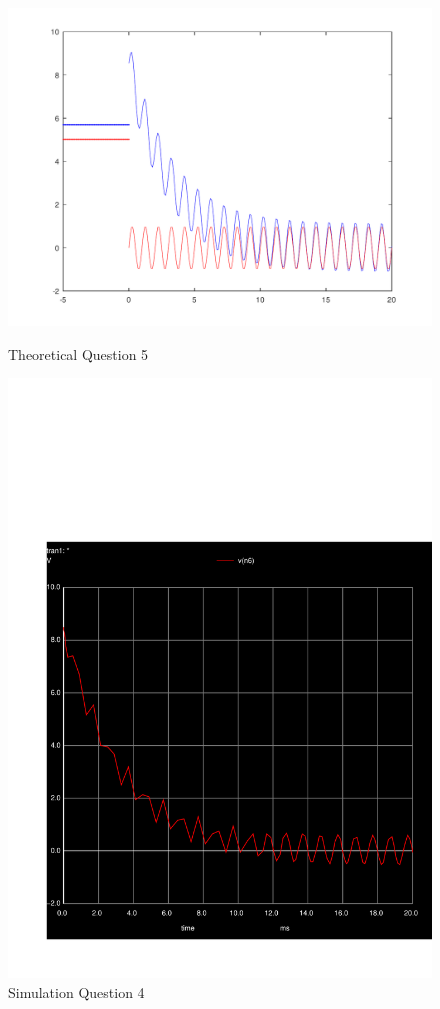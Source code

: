 \begin{figure}[H]
      \includegraphics[width=\linewidth]{../mat/alinea5.pdf}
      \caption{Theoretical Question 5}
    \endminipage\hfill
      \includegraphics[width=\linewidth]{../sim/transient4r.pdf}
      \caption{Simulation Question 4}
    \endminipage\hfill
\end{figure}
